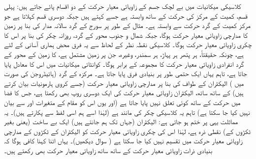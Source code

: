 کلاسیکی میکانیات میں بے لچک جسم کے زاویائی معیار حرکت کے دو اقسام پائے جاتے ہیں: پہلی قسم، کمیت کے مرکز کی حرکت کے ساتھ وابستہ ہے جسے   کہتے ہیں جبکہ دوسری قسم 
  کہلاتا ہے جو مرکز کمیت کے گرد حرکت سے وابستہ ہے۔ مثال کے طور پر سورج کے گرد سالانہ مدار کی بنا پر زمین کا مدارچی زاویائی معیار حرکت ہوگا، جبکہ شمال و جنوب محور کے گرد، روزانہ چکر کی بنا پر اس کا چکری زاویائی معیار حرکت ہوگا۔ کلاسیکی نقطہ نظر کے لحاظ سے یہ فرق محض ہماری آسانی کے لئے ہے، چونکہ حقیقتاً، ہر پتھر ہر پہاڑ، ہر سمندر، وغیرہ، جن پر زمین مشتمل ہے، کا زمین کے محور کے گرد انفرادی  زاویائی معیار حرکت کا مجموعہ  کے برابر ہوگا۔ کوانٹائی میکانیات میں اس کا معادل پایا جاتا ہے، تاہم یہاں ایک حتمی طور پر بنیادی فرق پایا جاتا ہے۔ مرکزہ کے گرد (ہائیڈروجن کی صورت میں ) الیکٹران کے طواف کی بنا پر مدارچی زاویائی معیار حرکت (جسے کروی ہارمونیات بیان کرتے ہیں) کے ساتھ ساتھ، الیکٹران زاویائی معیار حرکت کی ایک دوسری روپ بھی رکھتا ہے، جس کا فضا میں حرکت کے ساتھ کوئی تعلق نہیں پایا جاتا ہے (اور یوں اس کو مقام کے متغیرات   اور  سے بیان نہیں کیا جا سکتا ہے) تاہم یہ کلاسیکی چکر کی مانند ہے (لہٰذا اسے ہم اسی لفظ سے پکارتے ہیں)۔ یہ مماثلت یہی پر ختم ہو جاتی ہے: الیکٹران (جہاں تک ہم جانتے ہیں) ایک بے ساخت (یعنی بغیر ٹکڑوں کے) نقطی ذرہ ہے، لہٰذا اس کی چکری زاویائی معیار حرکت کو الیکٹران کے ٹکڑوں کے مدارچی زاویائی معیار حرکت میں تقسیم نہیں کیا جا سکتا ہے ( سوال  دیکھیں)۔ یہاں اتنا کہنا کافی ہوگا کہ بنیادی ذرات  زاویائی معیار حرکت  کے ساتھ ساتھ  زاویائی معیار حرکت  بھی رکھتے ہیں۔

